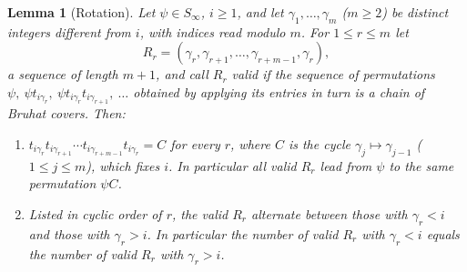 \documentclass{amsart}
\newtheorem{lemma}{Lemma}[section]
\theoremstyle{definition}
\theoremstyle{remark}
\numberwithin{equation}{section}
\begin{document}
\begin{lemma}[Rotation] \label{lemma:rotation}
Let $\psi\in S_\infty$, $i\geq1$, and let $\gamma_1,\ldots,\gamma_m$ ($m\geq2$) be distinct integers different from $i$, with indices read modulo $m$. For $1\leq r\leq m$ let
$$R_r=(\gamma_r,\gamma_{r+1},\ldots,\gamma_{r+m-1},\gamma_r),$$
a sequence of length $m+1$, and call $R_r$ \emph{valid} if the sequence of permutations $\psi,\ \psi t_{i\gamma_r},\ \psi t_{i\gamma_r}t_{i\gamma_{r+1}},\ \ldots$ obtained by applying its entries in turn is a chain of Bruhat covers. Then:
\begin{enumerate}
\item[(i)] $t_{i\gamma_r}t_{i\gamma_{r+1}}\cdots t_{i\gamma_{r+m-1}}t_{i\gamma_r}=C$ for every $r$, where $C$ is the cycle $\gamma_j\mapsto\gamma_{j-1}$ ($1\leq j\leq m$), which fixes $i$. In particular all valid $R_r$ lead from $\psi$ to the same permutation $\psi C$.
\item[(ii)] Listed in cyclic order of $r$, the valid $R_r$ alternate between those with $\gamma_r<i$ and those with $\gamma_r>i$. In particular the number of valid $R_r$ with $\gamma_r<i$ equals the number of valid $R_r$ with $\gamma_r>i$.
\end{enumerate}
\end{lemma}
\end{document}
